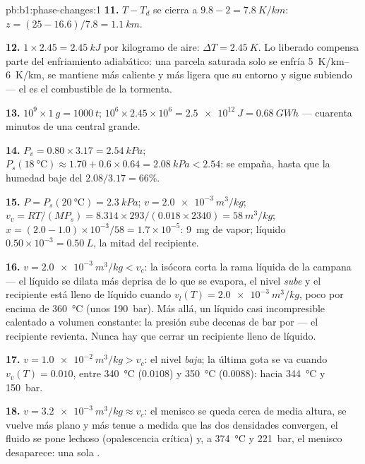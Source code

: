 \begin{solution}{pb:b1:phase-changes:1}
\textbf{11.} $T - T_d$ se cierra a $9.8 - 2 = \qty{7.8}{K/km}$: $z = (25 - 16.6)/
7.8 = \qty{1.1}{km}$.

\textbf{12.} $1 \times 2.45 = \qty{2.45}{kJ}$ por kilogramo de aire: $\Delta T =
\qty{2.45}{K}$. Lo liberado compensa parte del enfriamiento adiabático: una
parcela saturada solo se enfría \qtyrange{5}{6}{K/km}, se mantiene más
caliente y más ligera que su entorno y sigue subiendo --- el 
es el combustible de la tormenta.

\textbf{13.} $10^9 \times \qty{1}{g} = \qty{1000}{t}$; $10^6 \times 2.45 \times 10^6 =
\qty{2.5e12}{J} = \qty{0.68}{GW h}$ --- cuarenta minutos de una central grande.

\textbf{14.} $P_v = 0.80 \times 3.17 = \qty{2.54}{kPa}$; $P_s(\qty{18}{\degreeCelsius})
\approx 1.70 + 0.6 \times 0.64 = \qty{2.08}{kPa} < 2.54$: se empaña, hasta que la
humedad baje del $2.08/3.17 = 66\%$.

\textbf{15.} $P = P_s(\qty{20}{\degreeCelsius}) = \qty{2.3}{kPa}$; $v = \qty{2.0e-3}{m^3/kg}$;
$v_v = RT/(MP_s) = 8.314 \times 293/(0.018 \times 2340) = \qty{58}{m^3/kg}$; $x =
(2.0 - 1.0) \times 10^{-3}/58 = 1.7 \times 10^{-5}$: \qty{9}{mg} de vapor;
líquido $0.50 \times 10^{-3} = \qty{0.50}{L}$, la mitad del recipiente.

\textbf{16.} $v = \qty{2.0e-3}{m^3/kg} < v_c$: la isócora corta la rama
líquida de la campana --- el líquido se dilata más deprisa de lo que se
evapora, el nivel \emph{sube} y el recipiente está lleno de líquido cuando $v_l(T) =
\qty{2.0e-3}{m^3/kg}$, poco por encima de \qty{360}{\degreeCelsius} (unos
\qty{190}{bar}). Más allá, un líquido casi incompresible calentado a
volumen constante: la presión sube decenas de bar por  --- el
recipiente revienta. Nunca hay que cerrar un recipiente lleno de líquido.

\textbf{17.} $v = \qty{1.0e-2}{m^3/kg} > v_c$: el nivel \emph{baja}; la última
gota se va cuando $v_v(T) = 0.010$, entre \qty{340}{\degreeCelsius} ($0.0108$)
y \qty{350}{\degreeCelsius} ($0.0088$): hacia \qty{344}{\degreeCelsius} y
\qty{150}{bar}.

\textbf{18.} $v = \qty{3.2e-3}{m^3/kg} \approx v_c$: el menisco se queda cerca
de media altura, se vuelve más plano y más tenue a medida que las dos
densidades convergen, el fluido se pone lechoso (opalescencia crítica) y, a \qty{374}{\degreeCelsius}
y \qty{221}{bar}, el menisco desaparece: una sola .


\end{solution}
